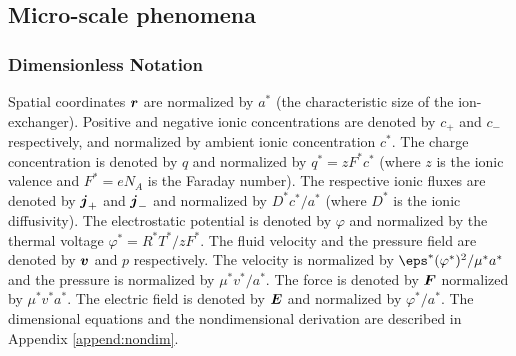 \subsection{Micro-scale phenomena}

\subsubsection{Dimensionless Notation}
Spatial coordinates $\boldsymbol{r}$ are normalized by $a^*$ (the characteristic size of the ion-exchanger).
Positive and negative ionic concentrations are denoted by $c_+$ and $c_-$ respectively, and
normalized by ambient ionic concentration $c^*$.
The charge concentration is denoted by $q$ and normalized by $q^* = z F^* c^*$ (where $z$
is the ionic valence and $F^* = e N_A$ is the Faraday number).
The respective ionic fluxes are denoted by $\boldsymbol{j}_+$ and $\boldsymbol{j}_-$ and 
normalized by $D^* c^*/a^*$ (where $D^*$ is the ionic diffusivity).
The electrostatic potential is denoted by $\varphi$ and normalized 
by the thermal voltage $\varphi^* = R^* T^* / z F^*$.
The fluid velocity and the pressure field are denoted by $\boldsymbol{v}$ and $p$ respectively.
The velocity is normalized by $\eps^* (\varphi^*)^2 / \mu^* a^*$ and the pressure
is normalized by $\mu^* v^* / a^*$.
The force is denoted by $\boldsymbol{F}$ normalized by $\mu^* v^* a^*$.
The electric field is denoted by $\boldsymbol{E}$ and normalized by $\varphi^* / a^*$.
The dimensional equations and the nondimensional derivation are 
described in Appendix \ref{append:nondim}.

